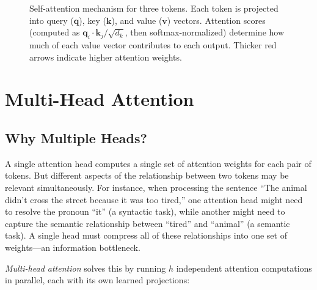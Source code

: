 \begin{figure}[ht]
\caption{Self-attention mechanism for three tokens. Each token is projected into query ($\mathbf{q}$), key ($\mathbf{k}$), and value ($\mathbf{v}$) vectors. Attention scores (computed as $\mathbf{q}_i \cdot \mathbf{k}_j / \sqrt{d_k}$, then softmax-normalized) determine how much of each value vector contributes to each output. Thicker red arrows indicate higher attention weights.}
\label{fig:attention-mechanism}
\end{figure}

\section{Multi-Head Attention}
\label{sec:multihead-attention}

\subsection{Why Multiple Heads?}

A single attention head computes a single set of attention weights for each pair of tokens. But different aspects of the relationship between two tokens may be relevant simultaneously. For instance, when processing the sentence ``The animal didn't cross the street because it was too tired,'' one attention head might need to resolve the pronoun ``it'' (a syntactic task), while another might need to capture the semantic relationship between ``tired'' and ``animal'' (a semantic task). A single head must compress all of these relationships into one set of weights---an information bottleneck.

\emph{Multi-head attention} solves this by running $h$ independent attention computations in parallel, each with its own learned projections:

